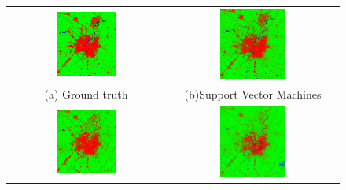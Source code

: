 \documentclass[12pt, a4paper]{report}
\begin{document}
\begin{figure}
\begin{center}
\begin{tabular}{cc}
  \includegraphics[width=0.4\textwidth]{test_gt} &   \includegraphics[width=0.4\textwidth]{svmAhmedabad.png} \\
(a) Ground truth & (b)Support Vector Machines \\[6pt]
 \includegraphics[width=0.4\textwidth]{knnAhmedabad.png} &   \includegraphics[width=0.4\textwidth]{decisiontreeAhmedabad} \\

\end{tabular}
\end{center}
\end{figure}
\end{document}
